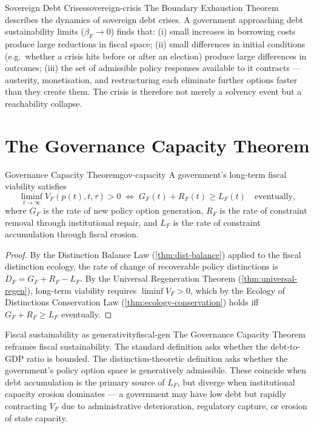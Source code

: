 \documentclass[12pt,twoside,openright]{book}
\begin{document}
\begin{example}{Sovereign Debt Crises}{sovereign-crisis}
  The Boundary Exhaustion Theorem describes the
  dynamics of sovereign debt crises. A government
  approaching debt sustainability limits
  ($\beta_F \to 0$) finds that:
  (i) small increases in borrowing costs produce large
  reductions in fiscal space; (ii) small differences
  in initial conditions (e.g.\ whether a crisis hits
  before or after an election) produce large
  differences in outcomes; (iii) the set of admissible
  policy responses available to it contracts —
  austerity, monetisation, and restructuring each
  eliminate further options faster than they create them.
  The crisis is therefore not merely a solvency event
  but a reachability collapse.
\end{example}

\section{The Governance Capacity Theorem}

\begin{theorem}{Governance Capacity Theorem}{gov-capacity}
  A government's long-term fiscal viability satisfies
  \[
    \liminf_{t\to\infty} V_F(p(t), t, \tau) > 0
    \;\iff\;
    G_F(t) + R_F(t) \ge L_F(t)
    \quad \text{eventually},
  \]
  where $G_F$ is the rate of new policy option
  generation, $R_F$ is the rate of constraint removal
  through institutional repair, and $L_F$ is the rate
  of constraint accumulation through fiscal erosion.
\end{theorem}

\begin{proof}
  By the Distinction Balance Law
  (\cref{thm:dist-balance}) applied to the fiscal
  distinction ecology, the rate of change of
  recoverable policy distinctions is
  $\dot{D}_F = G_F + R_F - L_F$.
  By the Universal Regeneration Theorem
  (\cref{thm:universal-regen}), long-term viability
  requires $\liminf V_F > 0$, which by the Ecology
  of Distinctions Conservation Law
  (\cref{thm:ecology-conservation}) holds iff
  $G_F + R_F \ge L_F$ eventually.
\end{proof}

\begin{remark}{Fiscal sustainability as generativity}{fiscal-gen}
  The Governance Capacity Theorem reframes fiscal
  sustainability. The standard definition asks
  whether the debt-to-GDP ratio is bounded.
  The distinction-theoretic definition asks whether
  the government's policy option space is generatively
  admissible. These coincide when debt accumulation is
  the primary source of $L_F$, but diverge when
  institutional capacity erosion dominates — a
  government may have low debt but rapidly contracting
  $V_F$ due to administrative deterioration, regulatory
  capture, or erosion of state capacity.
\end{remark}
\end{document}
